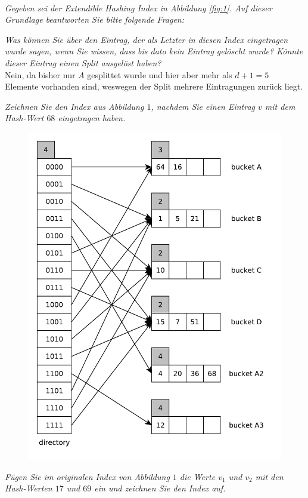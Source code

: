 \documentclass{uni_tue_template}
\begin{document}
\exercise{}\\
\emph{Gegeben sei der \emph{Extendible Hashing Index} in Abbildung \ref{fig:1}. Auf dieser Grundlage beantworten Sie bitte folgende Fragen:}
  \item \emph{Was können Sie über den Eintrag, der als Letzter in diesen Index eingetragen wurde sagen, wenn Sie wissen, dass bis dato kein Eintrag gelöscht wurde? Könnte dieser Eintrag einen Split ausgelöst haben?}\\
  Nein, da bisher nur $A$ gesplittet wurde und hier aber mehr als $d+1=5$ Elemente vorhanden sind, weswegen der Split mehrere Eintragungen zurück liegt.  
  \item \emph{Zeichnen Sie den Index aus Abbildung $1$, nachdem Sie einen Eintrag $v$ mit dem Hash-Wert $68$ eingetragen haben.}
  \begin{figure}[h!]
    \centering
    \includegraphics[scale=0.7]{graphml/01_2.pdf}
  \end{figure}
  \newpage
  \item \emph{Fügen Sie im originalen Index von Abbildung $1$ die Werte $v_1$ und $v_2$ mit den Hash-Werten $17$ und $69$ ein und zeichnen Sie den Index auf.}
\end{document}
